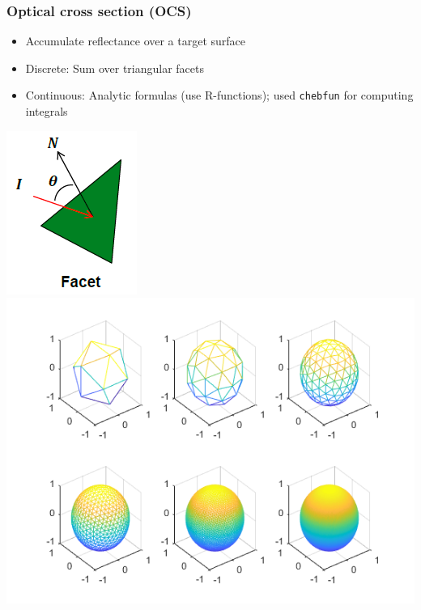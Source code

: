 \documentclass{beamer}
\begin{document}
\begin{frame}[fragile]
\frametitle{Optical cross section (OCS)}
\begin{itemize}
\item Accumulate reflectance over a target surface
\item Discrete: Sum over triangular facets 
\item Continuous: Analytic formulas (use R-functions); 
used \verb+chebfun+ for computing integrals
\end{itemize}
\centerline{\includegraphics[scale = 0.5]{./figs/facet.png} \: \includegraphics[scale = 0.5]{./figs/icosahedron.png}}
\end{frame}
\end{document}
